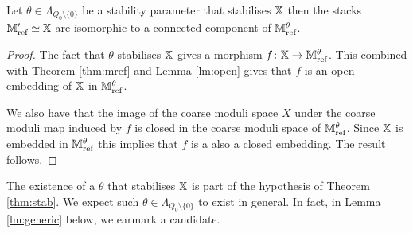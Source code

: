 \documentclass[12pt]{amsart}
\begin{document}
\begin{theorem}\label{thm:stab}
Let $\theta \in \Lambda_{{Q_0}\setminus \{0\}}$ be a stability parameter that stabilises $\mathbb{X}$ then the stacks $\mathbb{M}_{\textup{ref}}' \simeq \mathbb{X}$ are isomorphic to a connected component of $\mathbb{M}_{\textup{ref}}^\theta$.
\end{theorem}

\begin{proof}
The fact that $\theta$ stabilises $\mathbb{X}$ gives a morphism $f \colon \mathbb{X} \rightarrow \mathbb{M}_{\text{ref}}^\theta$.
This combined with Theorem \ref{thm:mref} and Lemma \ref{lm:open} gives that $f$ is an open embedding of $\mathbb{X}$ in $\mathbb{M}_{\text{ref}}^\theta$.

We also have that the image of the coarse moduli space $X$ under the coarse moduli map induced by $f$ is closed in the coarse moduli space of $\mathbb{M}_\text{ref}^\theta$. 
Since $\mathbb{X}$ is embedded in $\mathbb{M}_\text{ref}^\theta$ this implies that $f$ is a also a closed embedding.
The result follows.
\end{proof}

\begin{remark}
The existence of a $\theta$ that stabilises $\mathbb{X}$ is part of the hypothesis of Theorem \ref{thm:stab}.
We expect such $\theta \in \Lambda_{{Q_0}\setminus \{0\}}$ to exist in general.
In fact, in Lemma \ref{lm:generic} below, we earmark a candidate.
\end{remark}
\end{document}
